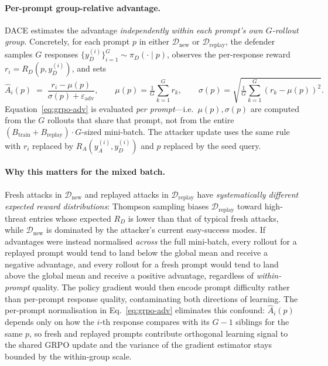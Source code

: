 \documentclass{article}
\newcommand{\method}{\textsc{DACE}\xspace}
\newcommand{\piD}{\pi_D}
\begin{document}
\paragraph{Per-prompt group-relative advantage.} \method estimates the advantage \emph{independently within each prompt's own $G$-rollout group}. Concretely, for each prompt $p$ in either $\mathcal{D}_{\mathrm{new}}$ or $\mathcal{D}_{\mathrm{replay}}$, the defender samples $G$ responses $\{y_D^{(i)}\}_{i=1}^G\sim\piD(\cdot\mid p)$, observes the per-response reward $r_i = R_D(p, y_D^{(i)})$, and sets
\begin{equation}
  \hat A_i(p) \;=\; \frac{r_i - \mu(p)}{\sigma(p) + \varepsilon_{\mathrm{adv}}},\qquad
  \mu(p) = \tfrac{1}{G}\textstyle\sum_{k=1}^{G} r_k,\qquad
  \sigma(p) = \sqrt{\tfrac{1}{G}\textstyle\sum_{k=1}^{G}(r_k - \mu(p))^2}.
  \label{eq:grpo-adv}
\end{equation}
Equation~\ref{eq:grpo-adv} is evaluated \emph{per prompt}---i.e.\ $\mu(p), \sigma(p)$ are computed from the $G$ rollouts that share that prompt, not from the entire $(B_{\mathrm{train}}+B_{\mathrm{replay}})\cdot G$-sized mini-batch. The attacker update uses the same rule with $r_i$ replaced by $R_A(y_A^{(i)}, y_D^{(i)})$ and $p$ replaced by the seed query.

\paragraph{Why this matters for the mixed batch.} Fresh attacks in $\mathcal{D}_{\mathrm{new}}$ and replayed attacks in $\mathcal{D}_{\mathrm{replay}}$ have \emph{systematically different expected reward distributions}: Thompson sampling biases $\mathcal{D}_{\mathrm{replay}}$ toward high-threat entries whose expected $R_D$ is lower than that of typical fresh attacks, while $\mathcal{D}_{\mathrm{new}}$ is dominated by the attacker's current easy-success modes. If advantages were instead normalised \emph{across} the full mini-batch, every rollout for a replayed prompt would tend to land below the global mean and receive a negative advantage, and every rollout for a fresh prompt would tend to land above the global mean and receive a positive advantage, regardless of \emph{within-prompt} quality. The policy gradient would then encode prompt difficulty rather than per-prompt response quality, contaminating both directions of learning. The per-prompt normalisation in Eq.~\ref{eq:grpo-adv} eliminates this confound: $\hat A_i(p)$ depends only on how the $i$-th response compares with its $G-1$ siblings for the same $p$, so fresh and replayed prompts contribute orthogonal learning signal to the shared GRPO update and the variance of the gradient estimator stays bounded by the within-group scale.
\end{document}
